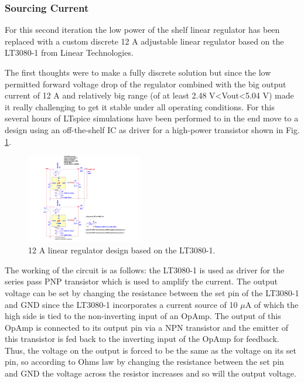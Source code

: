 \subsubsection{Sourcing Current}
For this second iteration the low power of the shelf linear regulator has been replaced with a custom discrete 12 A adjustable linear regulator based on the LT3080-1 from Linear Technologies.

The first thoughts were to make a fully discrete solution but since the low permitted forward voltage drop of the regulator combined with the big output current of 12 A and relatively big range (of at least 2.48 V\textless Vout\textless 5.04 V) made it really challenging to get it stable under all operating conditions. For this several hours of LTspice simulations have been performed to in the end move to a design using an off-the-shelf IC as driver for a high-power transistor shown in Fig. \ref{fig:LT3080-1_LinRegSchematic}.

\begin{figure}[h!]
    \centering
    \includegraphics[width=0.45\textwidth]{LT3080-1_LinRegSchematic.pdf}
    \caption{12 A linear regulator design based on the LT3080-1.}
    \label{fig:LT3080-1_LinRegSchematic}
\end{figure}

The working of the circuit is as follows: the LT3080-1 is used as driver for the series pass PNP transistor which is used to amplify the current.
The output voltage can be set by changing the resistance between the set pin of the LT3080-1 and GND since the LT3080-1 incorporates a current source of 10 $\mu$A of which the high side is tied to the non-inverting input of an OpAmp. The output of this OpAmp is connected to its output pin via a NPN transistor and the emitter of this transistor is fed back to the inverting input of the OpAmp for feedback. Thus, the voltage on the output is forced to be the same as the voltage on its set pin, so according to Ohms law by changing the resistance between the set pin and GND the voltage across the resistor increases and so will the output voltage.


